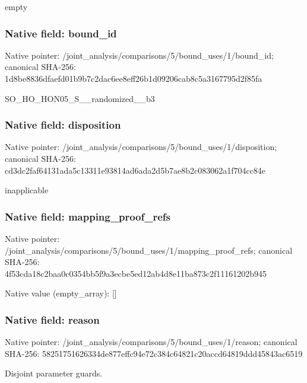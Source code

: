 \documentclass[10pt,a4paper]{article}
\begin{document}
\begingroup\raggedright\sloppy empty\par\endgroup

\subsubsection{Native field: bound\_\allowbreak{}id}
Native pointer: /joint\_\allowbreak{}analysis/comparisons/5/bound\_\allowbreak{}uses/1/bound\_\allowbreak{}id; canonical SHA-256: 1d8be8836dfaefd01b9b7c2dac6ee8eff26b1d09206cab8c5a3167795d2f85fa

\begingroup\raggedright\sloppy SO\_\allowbreak{}HO\_\allowbreak{}HON05\_\allowbreak{}S\_\allowbreak{}\_\allowbreak{}randomized\_\allowbreak{}\_\allowbreak{}b3\par\endgroup

\subsubsection{Native field: disposition}
Native pointer: /joint\_\allowbreak{}analysis/comparisons/5/bound\_\allowbreak{}uses/1/disposition; canonical SHA-256: cd3dc2faf64131ada5c13311e93814ad6ada2d5b7ae8b2c083062a1f704cc84e

\begingroup\raggedright\sloppy inapplicable\par\endgroup

\subsubsection{Native field: mapping\_\allowbreak{}proof\_\allowbreak{}refs}
Native pointer: /joint\_\allowbreak{}analysis/comparisons/5/bound\_\allowbreak{}uses/1/mapping\_\allowbreak{}proof\_\allowbreak{}refs; canonical SHA-256: 4f53cda18c2baa0c0354bb5f9a3ecbe5ed12ab4d8e11ba873c2f11161202b945

Native value (empty\_\allowbreak{}array): []

\subsubsection{Native field: reason}
Native pointer: /joint\_\allowbreak{}analysis/comparisons/5/bound\_\allowbreak{}uses/1/reason; canonical SHA-256: 58251751626334de877effc94e72c384c64821c20accd64819ddd45843ac6519

\begingroup\raggedright\sloppy Disjoint parameter guards.\par\endgroup
\end{document}
